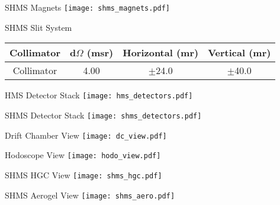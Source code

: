 \begin{Mfigure}{SHMS Magnets}
  \centering
  \texttt{[image: shms\_magnets.pdf]}
  \caption{Overview of SHMS optical setup.}
  \label{fig:2-4_shms_magnets}
\end{Mfigure}

\begin{Mtable}{SHMS Slit System}
  \centering
  \begin{tabular}{|c|c|c|c|}
    \hline
    \textbf{Collimator} & \textbf{d$\Omega$ (msr)} & \textbf{Horizontal (mr)} & \textbf{Vertical (mr)} \\
    \hline
     Collimator & 4.00 & $\pm$24.0 & $\pm$40.0 \\
    \hline
  \end{tabular}
  \caption{Breakdown of SHMS slit system's apertures.}
  \label{tab:2-4_shms_slit}
\end{Mtable}

\begin{Mfigure}{HMS Detector Stack}
  \centering
  \texttt{[image: hms\_detectors.pdf]}
  \caption{Overview of HMS Detector Stack.}
  \label{fig:2-4_hms_detectors}
\end{Mfigure}

\begin{Mfigure}{SHMS Detector Stack}
  \centering
  \texttt{[image: shms\_detectors.pdf]}
  \caption{Overview of SHMS Detector Stack.}
  \label{fig:2-4_shms_detectors}
\end{Mfigure}

\begin{Mfigure}{Drift Chamber View}
  \centering
  \texttt{[image: dc\_view.pdf]}
  \caption{Basic design and components of DC1 (left) and DC2 (right).}
  \label{fig:2-4_dc_view}
\end{Mfigure}

\begin{Mfigure}{Hodoscope View}
  \centering
  \texttt{[image: hodo\_view.pdf]}
  \caption{Basic design of a hodoscope pair.}
  \label{fig:2-4_hodo_view}
\end{Mfigure}

\begin{Mfigure}{SHMS HGC View}
  \centering
  \texttt{[image: shms\_hgc.pdf]}
  \caption{View of the SHMS Heavy Gas Cerenkov's four mirrors and PMTs.}
  \label{fig:2-4_shms_hgc}
\end{Mfigure}

\begin{Mfigure}{SHMS Aerogel View}
  \centering
  \texttt{[image: shms\_aero.pdf]}
  \caption{View of the SHMS aerogel Cerenkov.}
  \label{fig:2-4_shms_aero}
\end{Mfigure}

